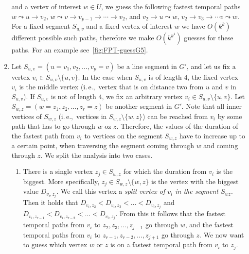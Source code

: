 \documentclass[11pt,a4paper]{article}
\theoremstyle{remark}
\theoremstyle{definition}
\newcommand{\ie}{i.\,e.,\ }
\begin{document}
\begin{enumerate}[G-1.]
    and a vertex of interest $w \in U$,
    we guess the following fastest temporal paths
    $w \leadsto u \rightarrow v_2$, $w \leadsto v \rightarrow v_{p-1} \rightarrow \cdots \rightarrow v_2$,
    and
    $v_2 \rightarrow u \leadsto w$, $v_2 \rightarrow v_3 \rightarrow \cdots v \leadsto w$.
    \\
    For a fixed segment $S_{u,v}$ and a fixed vertex of interest $w$ we have $O(k^k)$ different possible such paths, therefore we make $O(k^{k^4})$ guesses for these paths.
    For an example see~\cref{fig:FPT-guessG5}.
    \item \label{FPT:guess-splitFromAnotherSegmentAndPaths}
    Let $S_{u,v} = (u=v_1,v_2, \dots, v_p = v)$ be a line segment in $G'$, and let us
    fix a vertex $v_i \in S_{u,v} \setminus \{u,v\}$.
    In the case when $S_{u,v}$ is of length $4$, the fixed vertex $v_i$ is the middle vertex (\ie vertex that is on distance two from $u$ and $v$ in $S_{u,v}$).
    If $S_{u,v}$ is not of length $4$, we fix an arbitrary vertex $v_i \in S_{u,v} \setminus \{u,v\}$.
    Let 
    $S_{w,z} = (w=z_1,z_2, \dots, z_r = z)$ be another segment in $G'$.
    Note that all inner vertices of $S_{w,z}$ (\ie vertices in $S_{w,z} \setminus \{w,z\}$)
    can be reached from $v_i$ by some path that has to go through $w$ oz $z$.
    Therefore, the values of the duration of the fastest path from $v_i$ to vertices on 
    the segment
    $S_{w,z}$ have to increase up to a certain point, when traversing the segment coming through $w$ and coming through $z$.
    We split the analysis into two cases.
    \begin{enumerate}
        \item 
    There is a single vertex $z_j \in S_{w,z}$ for which the duration from $v_i$ is the biggest.
    More specifically, $z_j \in S_{w,z} \setminus \{w,z\}$ is the vertex with the biggest value  $D_{v_i,z_j}$.
    We call this vertex a \emph{split vertex of $v_i$ in the segment $S_{wz}$}.
    Then it holds that $D_{v_i,z_2} < D_{v_i,z_3} < \dots < D_{v_i,z_j}$ and 
    $D_{v_i,z_{r-1}} < D_{v_i,z_{r-2}} < \dots < D_{v_i,z_j}$.
    From this it follows that the fastest temporal paths from $v_i$ to $z_2, z_3, \dots, z_{j-1}$ go through $w$,
    and 
    the fastest temporal paths from $v_i$ to $z_{r-1}, z_{r-2}, \dots, z_{j+1}$ go through $z$.
    We now want to guess which vertex $w$ or $z$ is on a fastest temporal path from $v_i$ to $z_j$.

\end{enumerate}
\end{enumerate}
\end{document}
